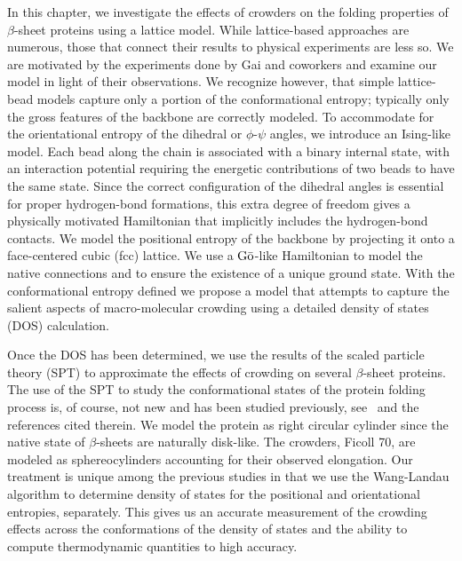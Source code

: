 In this chapter, we investigate the effects of crowders on the folding properties of $\beta$-sheet proteins using a lattice model. While lattice-based approaches are numerous, those that connect their results to physical experiments are less so. We are motivated by the experiments done by Gai and coworkers\cite{xu_probing_2008, mukherjee_effect_2009,du_understanding_2006} and examine our model in light of their observations. We recognize however, that simple lattice-bead models capture only a portion of the conformational entropy; typically only the gross features of the backbone are correctly modeled. To accommodate for the orientational entropy of the dihedral or $\phi$-$\psi$ angles, we introduce an Ising-like model. Each bead along the chain is associated with a binary internal state, with an interaction potential requiring the energetic contributions of two beads to have the same state. Since the correct configuration of the dihedral angles is essential for proper hydrogen-bond formations, this extra degree of freedom gives a physically motivated Hamiltonian that implicitly includes the hydrogen-bond contacts. We model the positional entropy of the backbone by projecting it onto a face-centered cubic (fcc) lattice. We use a $\text{G}\bar{\text{o}}$-like Hamiltonian to model the native connections and to ensure the existence of a unique ground state. With the conformational entropy defined we propose a model that attempts to capture the salient aspects of macro-molecular crowding using a detailed density of states (DOS) calculation. 

Once the DOS has been determined, we use the results of the scaled particle theory (SPT) to approximate the effects of crowding on several $\beta$-sheet proteins. The use of the SPT to study the conformational states of the protein folding process is, of course, not new and has been studied previously, see~\cite{mittal_dependence_2010, ping_depletion_2006, batra_effect_2009, minton_models_2005} and the references cited therein. We model the protein as right circular cylinder since the native state of $\beta$-sheets are naturally disk-like. The crowders, Ficoll 70, are modeled as sphereocylinders accounting for their observed elongation.\cite{asgeirsson_glomerular_2007, fodeke_quantitative_2010} Our treatment is unique among the previous studies in that we use the Wang-Landau algorithm to determine density of states for the positional and orientational entropies, separately. This gives us an accurate measurement of the crowding effects across the conformations of the density of states and the ability to compute thermodynamic quantities to high accuracy.

